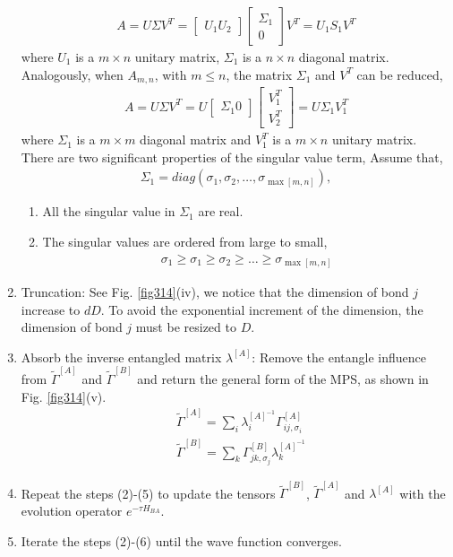 \begin{enumerate}
		\begin{align}
			A = U \Sigma V^T = \begin{bmatrix} U_1 U_2 \end{bmatrix} \begin{bmatrix} \Sigma_1 \\ 0 \end{bmatrix} V^T = U_1 S_1 V^T
		\end{align}
where $U_1$ is a $m \times n$ unitary matrix, $\Sigma_1$ is a $n \times n$ diagonal matrix. Analogously, when $A_{m,n}$, with $m \leq n$, the matrix $\Sigma_1$ and $V^T$ can be reduced,
\begin{align}
	A = U \Sigma V^T = U \begin{bmatrix} \Sigma_1 0 \end{bmatrix} \begin{bmatrix} V_1^T \\ V_2^T \end{bmatrix} = U \Sigma_1 V_1^T
\end{align}
where $\Sigma_1$ is a $m \times m$ diagonal matrix and $V_1^T$ is a $m \times n$ unitary matrix. There are two significant properties of the singular value term, Assume that,
\begin{align}
\Sigma_1 = diag \left(\sigma_1, \sigma_2, \dots, \sigma_{\max{[m,n]}} \right), 
\end{align}
\begin{enumerate}
	\item All the singular value in $\Sigma_1$ are real.
	\item The singular values are ordered from large to small,
		\begin{align}
			\sigma_1 \geq \sigma_1 \geq \sigma_2 \geq \dots \geq \sigma_{\max{[m,n]}}
		\end{align}
\end{enumerate}
		\item Truncation: See Fig. \ref{fig314}(iv), we notice that the dimension of bond $j$ increase to $dD$. To avoid the exponential increment of the dimension, the dimension of bond $j$ must be resized to $D$.
		\item Absorb the inverse entangled matrix $\lambda^{[A]}$: Remove the entangle influence from $\widetilde{\Gamma}^{[A]}$ and $\widetilde{\Gamma}^{[B]}$ and return the general form of the MPS, as shown in Fig. \ref{fig314}(v).
			\begin{align}
				&\widetilde{\Gamma}^{[A]} = \sum_{i}{ \lambda_{i}^{[A]^{-1}} \Gamma^{[A]}_{ij,\sigma_i}} \\
				&\widetilde{\Gamma}^{[B]} = \sum_{k}{\Gamma^{[B]}_{jk,\sigma_j} \lambda_{k}^{[A]^{-1}}}
			\end{align}
		\item Repeat the steps (2)-(5) to update the tensors $\widetilde{\Gamma}^{[B]}$, $\widetilde{\Gamma}^{[A]}$ and $\lambda^{[A]}$ with the evolution operator $e^{-\tau H_{BA}}$.
		\item Iterate the steps (2)-(6) until the wave function converges.
\end{enumerate}

